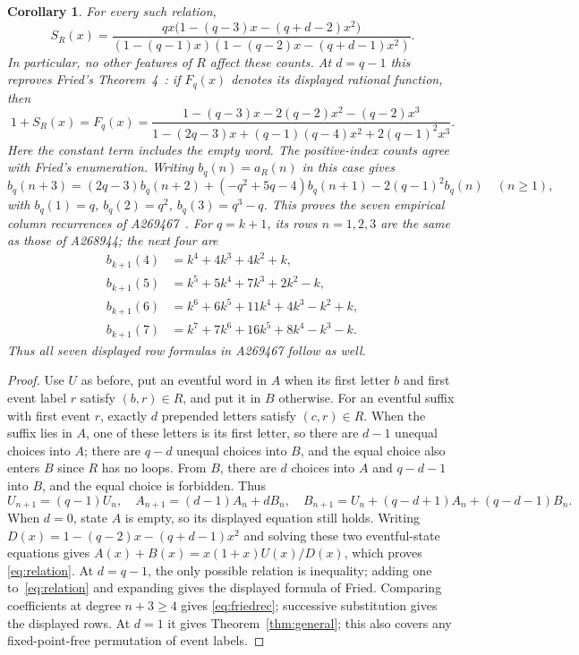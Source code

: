 \documentclass[11pt]{article}
\newtheorem{corollary}[theorem]{Corollary}
\begin{document}
\begin{corollary}\label{cor:relation}
For every such relation,
\begin{equation}\label{eq:relation}
 S_R(x)=\frac{qx\bigl(1-(q-3)x-(q+d-2)x^2\bigr)}
 {(1-(q-1)x)(1-(q-2)x-(q+d-1)x^2)}.
\end{equation}
In particular, no other features of $R$ affect these counts. At $d=q-1$
this reproves Fried's Theorem~4~\cite{fried}: if $F_q(x)$ denotes its
displayed rational function, then
\[
 1+S_R(x)=F_q(x)=
 \frac{1-(q-3)x-2(q-2)x^2-(q-2)x^3}
 {1-(2q-3)x+(q-1)(q-4)x^2+2(q-1)^2x^3}.
\]
Here the constant term includes the empty word. The positive-index counts
agree with Fried's enumeration. Writing $b_q(n)=a_R(n)$ in this case gives
\begin{equation}\label{eq:friedrec}
 b_q(n+3)=(2q-3)b_q(n+2)+(-q^2+5q-4)b_q(n+1)
             -2(q-1)^2b_q(n)\quad(n\geq1),
\end{equation}
with $b_q(1)=q$, $b_q(2)=q^2$, $b_q(3)=q^3-q$.
This proves the seven empirical column recurrences of A269467~\cite{unequal}.
For $q=k+1$, its rows $n=1,2,3$ are the same as those of A268944;
the next four are
\begin{align*}
 b_{k+1}(4)&=k^4+4k^3+4k^2+k,\\
 b_{k+1}(5)&=k^5+5k^4+7k^3+2k^2-k,\\
 b_{k+1}(6)&=k^6+6k^5+11k^4+4k^3-k^2+k,\\
 b_{k+1}(7)&=k^7+7k^6+16k^5+8k^4-k^3-k.
\end{align*}
Thus all seven displayed row formulas in A269467 follow as well.
\end{corollary}
\begin{proof}
Use $U$ as before, put an eventful word in $A$ when its first letter $b$
and first event label $r$ satisfy $(b,r)\in R$, and put it in $B$ otherwise.
For an eventful suffix with first event $r$, exactly $d$ prepended letters
satisfy $(c,r)\in R$. When the suffix lies in $A$, one of these letters
is its first letter, so there are $d-1$ unequal choices into $A$;
there are $q-d$ unequal choices into $B$, and the equal choice also
enters $B$ since $R$ has no loops. From $B$, there are $d$ choices into
$A$ and $q-d-1$ into $B$, and the equal choice is forbidden. Thus
\[
 U_{n+1}=(q-1)U_n,\quad A_{n+1}=(d-1)A_n+dB_n,\quad
 B_{n+1}=U_n+(q-d+1)A_n+(q-d-1)B_n.
\]
When $d=0$, state $A$ is empty, so its displayed equation still holds.
Writing $D(x)=1-(q-2)x-(q+d-1)x^2$ and solving these two eventful-state
equations gives $A(x)+B(x)=x(1+x)U(x)/D(x)$, which proves
\eqref{eq:relation}. At $d=q-1$, the only possible relation is inequality;
adding one to~\eqref{eq:relation} and expanding gives the displayed
formula of Fried. Comparing coefficients at degree $n+3\geq4$ gives
\eqref{eq:friedrec}; successive substitution gives the displayed rows.
At $d=1$ it gives Theorem~\ref{thm:general}; this also
covers any fixed-point-free permutation of event labels.
\end{proof}
\end{document}
